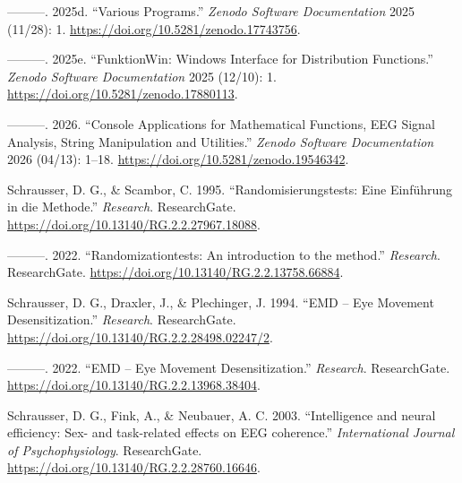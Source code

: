 \documentclass[
]{article}
\newlength{\cslhangindent}
\newlength{\cslentryspacingunit} %
\newenvironment{CSLReferences}[2] %
 {%
  \setlength{\parindent}{0pt}
  \ifodd #1
  \let\oldpar\par
  \def\par{\hangindent=\cslhangindent\oldpar}
  \fi
  \setlength{\parskip}{#2\cslentryspacingunit}
 }%
 {}
\begin{document}
\begin{CSLReferences}{1}{0}
\leavevmode{}%
---------. 2025d. {``Various Programs.''} \emph{Zenodo Software
Documentation} 2025 (11/28): 1.
\url{https://doi.org/10.5281/zenodo.17743756}.

\leavevmode{}%
---------. 2025e. {``FunktionWin: Windows Interface for Distribution
Functions.''} \emph{Zenodo Software Documentation} 2025 (12/10): 1.
\url{https://doi.org/10.5281/zenodo.17880113}.

\leavevmode{}%
---------. 2026. {``Console Applications for Mathematical Functions, EEG
Signal Analysis, String Manipulation and Utilities.''} \emph{Zenodo
Software Documentation} 2026 (04/13): 1--18.
\url{https://doi.org/10.5281/zenodo.19546342}.

\leavevmode{}%
Schrausser, D. G., \& Scambor, C. 1995. {``{Randomisierungstests: Eine
Einführung in die Methode}.''} \emph{Research}. ResearchGate.
\url{https://doi.org/10.13140/RG.2.2.27967.18088}.

\leavevmode{}%
---------. 2022. {``{Randomizationtests: An introduction to the
method}.''} \emph{Research}. ResearchGate.
\url{https://doi.org/10.13140/RG.2.2.13758.66884}.

\leavevmode{}%
Schrausser, D. G., Draxler, J., \& Plechinger, J. 1994. {``{EMD -- Eye
Movement Desensitization}.''} \emph{Research}. ResearchGate.
\url{https://doi.org/10.13140/RG.2.2.28498.02247/2}.

\leavevmode{}%
---------. 2022. {``{EMD -- Eye Movement Desensitization}.''}
\emph{Research}. ResearchGate.
\url{https://doi.org/10.13140/RG.2.2.13968.38404}.

\leavevmode{}%
Schrausser, D. G., Fink, A., \& Neubauer, A. C. 2003. {``{Intelligence
and neural efficiency: Sex- and task-related effects on EEG
coherence}.''} \emph{International Journal of Psychophysiology}.
ResearchGate. \url{https://doi.org/10.13140/RG.2.2.28760.16646}.

\end{CSLReferences}
\end{document}
